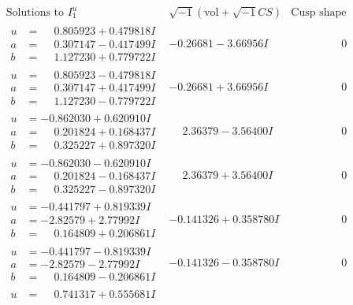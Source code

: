 \documentclass[1p]{elsarticle_modified}
\theoremstyle{definition}
\newcommand{\I}{\sqrt{-1}}
\begin{document}
$$\begin{array}{c|c|c}
\text{Solutions to }I^u_{1}& \I (\text{vol} + \sqrt{-1}CS) & \text{Cusp shape}\\
 \hline 
\begin{aligned}
u &= \phantom{-}0.805923 + 0.479818 I \\
a &= \phantom{-}0.307147 - 0.417499 I \\
b &= \phantom{-}1.127230 + 0.779722 I\end{aligned}
 & -0.26681 - 3.66956 I & \phantom{-0.000000 } 0 \\ \hline\begin{aligned}
u &= \phantom{-}0.805923 - 0.479818 I \\
a &= \phantom{-}0.307147 + 0.417499 I \\
b &= \phantom{-}1.127230 - 0.779722 I\end{aligned}
 & -0.26681 + 3.66956 I & \phantom{-0.000000 } 0 \\ \hline\begin{aligned}
u &= -0.862030 + 0.620910 I \\
a &= \phantom{-}0.201824 + 0.168437 I \\
b &= \phantom{-}0.325227 + 0.897320 I\end{aligned}
 & \phantom{-}2.36379 - 3.56400 I & \phantom{-0.000000 } 0 \\ \hline\begin{aligned}
u &= -0.862030 - 0.620910 I \\
a &= \phantom{-}0.201824 - 0.168437 I \\
b &= \phantom{-}0.325227 - 0.897320 I\end{aligned}
 & \phantom{-}2.36379 + 3.56400 I & \phantom{-0.000000 } 0 \\ \hline\begin{aligned}
u &= -0.441797 + 0.819339 I \\
a &= -2.82579 + 2.77992 I \\
b &= \phantom{-}0.164809 + 0.206861 I\end{aligned}
 & -0.141326 + 0.358780 I & \phantom{-0.000000 } 0 \\ \hline\begin{aligned}
u &= -0.441797 - 0.819339 I \\
a &= -2.82579 - 2.77992 I \\
b &= \phantom{-}0.164809 - 0.206861 I\end{aligned}
 & -0.141326 - 0.358780 I & \phantom{-0.000000 } 0 \\ \hline\begin{aligned}
u &= \phantom{-}0.741317 + 0.555681 I \\

\end{aligned}
\end{array}$$
\end{document}
